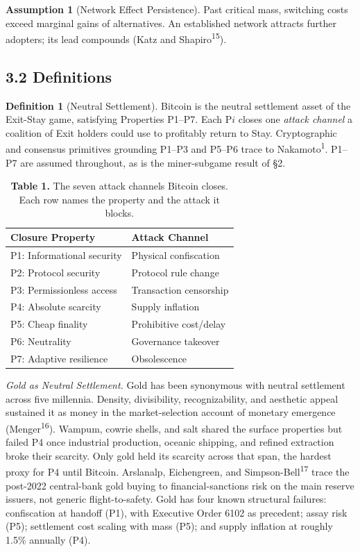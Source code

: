 \documentclass[12pt]{article}
\theoremstyle{definition}
\newtheorem{definition}{Definition}
\newtheorem{assumption}{Assumption}
\theoremstyle{remark}
\begin{document}
\begin{assumption}[Network Effect Persistence]
Past critical mass, switching costs exceed marginal gains of alternatives. An established network attracts further adopters; its lead compounds (Katz and Shapiro\textsuperscript{15}).
\end{assumption}

\subsection{3.2 Definitions}

\begin{definition}[Neutral Settlement]
Bitcoin is the neutral settlement asset of the Exit-Stay game, satisfying Properties P1--P7. Each P$i$ closes one \emph{attack channel} a coalition of Exit holders could use to profitably return to Stay. Cryptographic and consensus primitives grounding P1--P3 and P5--P6 trace to Nakamoto\textsuperscript{1}. P1--P7 are assumed throughout, as is the miner-subgame result of \S2.
\end{definition}

\begin{table}[h]
\centering
\caption*{\textbf{Table 1.} The seven attack channels Bitcoin closes. Each row names the property and the attack it blocks.}
\begin{tabular}{ll}
\toprule
Closure Property & Attack Channel \\
\midrule
P1: Informational security & Physical confiscation \\
P2: Protocol security & Protocol rule change \\
P3: Permissionless access & Transaction censorship \\
P4: Absolute scarcity & Supply inflation \\
P5: Cheap finality & Prohibitive cost/delay \\
P6: Neutrality & Governance takeover \\
P7: Adaptive resilience & Obsolescence \\
\bottomrule
\end{tabular}
\end{table}

\noindent\emph{Gold as Neutral Settlement.} Gold has been synonymous with neutral settlement across five millennia. Density, divisibility, recognizability, and aesthetic appeal sustained it as money in the market-selection account of monetary emergence (Menger\textsuperscript{16}). Wampum, cowrie shells, and salt shared the surface properties but failed P4 once industrial production, oceanic shipping, and refined extraction broke their scarcity. Only gold held its scarcity across that span, the hardest proxy for P4 until Bitcoin. Arslanalp, Eichengreen, and Simpson-Bell\textsuperscript{17} trace the post-2022 central-bank gold buying to financial-sanctions risk on the main reserve issuers, not generic flight-to-safety. Gold has four known structural failures: confiscation at handoff (P1), with Executive Order 6102 as precedent; assay risk (P5); settlement cost scaling with mass (P5); and supply inflation at roughly 1.5\% annually (P4).
\end{document}
